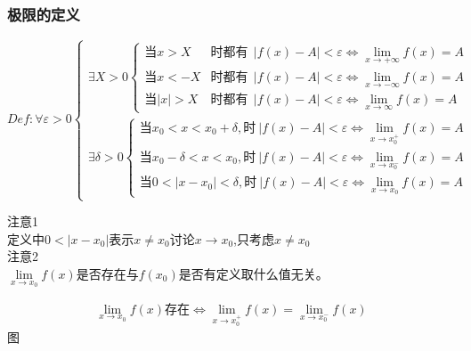\subsubsection{极限的定义}
$Def: \forall \varepsilon >0\begin{cases}
    \exists X>0\begin{cases}
        \mbox{当}x>X&\mbox{时都有}\ \ \left|f(x)-A\right|<\varepsilon \Leftrightarrow \lim\limits_{x\to +\infty}f(x)=A\\
        \mbox{当}x<-X&\mbox{时都有}\ \ \left|f(x)-A\right|<\varepsilon \Leftrightarrow \lim\limits_{x\to -\infty}f(x)=A\\
        \mbox{当}\left|x\right|>X&\mbox{时都有}\ \ \left|f(x)-A\right|<\varepsilon \Leftrightarrow \lim\limits_{x\to \infty}f(x)=A
    \end{cases}\\
    \exists\delta>0\begin{cases}
        \mbox{当}x_0<x<x_0+\delta,\mbox{时}\ \left|f(x)-A\right|<\varepsilon\Leftrightarrow\lim\limits_{x\to x_0^+}f(x)=A\\
        \mbox{当}x_0-\delta<x<x_0 ,\mbox{时}\ \left|f(x)-A\right|<\varepsilon\Leftrightarrow\lim\limits_{x\to x_0^-}f(x)=A\\
        \mbox{当}0<\left|x-x_0\right|<\delta,\mbox{时}\ \left|f(x)-A\right|<\varepsilon\Leftrightarrow\lim\limits_{x\to x_0}f(x)=A
    \end{cases}
\end{cases}$
\begin{center}
    注意1\\定义中$0<\left|x-x_0\right|$表示$x\neq x_0$讨论$x\rightarrow x_0$,只考虑$x\neq x_0$\\
    注意2\\$\lim\limits_{x\to x_0}f(x)$是否存在与$f(x_0)$是否有定义取什么值无关。\\
\end{center}
    \begin{align}
        \lim\limits_{x\to x_0}f(x)\mbox{存在}\Leftrightarrow \lim\limits_{x\to x_0^+}f(x)=\lim\limits_{x\to x_0^-}f(x)\label{limit_left_right}
    \end{align}
图
